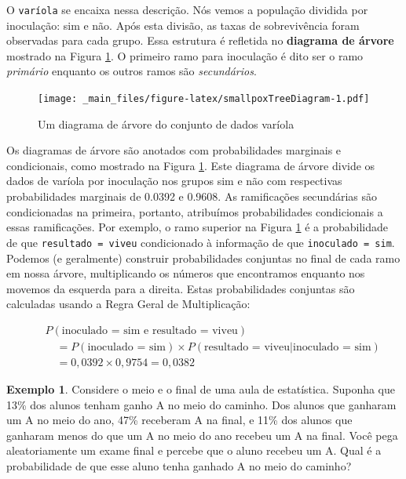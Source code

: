 \documentclass[
]{book}
\theoremstyle{definition}
\theoremstyle{definition}
\newtheorem{example}{Exemplo}[chapter]
\theoremstyle{definition}
\theoremstyle{definition}
\theoremstyle{remark}
\begin{document}
O \texttt{varíola} se encaixa nessa descrição. Nós vemos a população dividida por inoculação: sim e não. Após esta divisão, as taxas de sobrevivência foram observadas para cada grupo. Essa estrutura é refletida no \textbf{diagrama de árvore} mostrado na Figura \ref{fig:smallpoxTreeDiagram}. O primeiro ramo para inoculação é dito ser o ramo \emph{primário} enquanto os outros ramos são \emph{secundários}.

\begin{figure}
\centering
\texttt{[image: \_main\_files/figure-latex/smallpoxTreeDiagram-1.pdf]}
\caption{\label{fig:smallpoxTreeDiagram}Um diagrama de árvore do conjunto de dados varíola}
\end{figure}

Os diagramas de árvore são anotados com probabilidades marginais e condicionais, como mostrado na Figura \ref{fig:smallpoxTreeDiagram}. Este diagrama de árvore divide os dados de varíola por inoculação nos grupos sim e não com respectivas probabilidades marginais de 0.0392 e 0.9608. As ramificações secundárias são condicionadas na primeira, portanto, atribuímos probabilidades condicionais a essas ramificações. Por exemplo, o ramo superior na Figura \ref{fig:smallpoxTreeDiagram} é a probabilidade de que \texttt{resultado\ =\ viveu} condicionado à informação de que \texttt{inoculado\ =\ sim}. Podemos (e geralmente) construir probabilidades conjuntas no final de cada ramo em nossa árvore, multiplicando os números que encontramos enquanto nos movemos da esquerda para a direita. Estas probabilidades conjuntas são calculadas usando a Regra Geral de Multiplicação:

\begin{eqnarray*}
&& P(\text{inoculado = sim e resultado = viveu}) \\
    &&\quad = P(\text{inoculado = sim})\times P(\text{resultado = viveu}|\text{inoculado = sim}) \\
    &&\quad = 0,0392\times 0,9754=0,0382
\end{eqnarray*}

\begin{example}
\protect\hypertarget{exm:exerciseForTreeDiagramOfStudentGettingAOnMidtermGivenThatSheGotAOnFinal}{}{\label{exm:exerciseForTreeDiagramOfStudentGettingAOnMidtermGivenThatSheGotAOnFinal} }Considere o meio e o final de uma aula de estatística. Suponha que 13\% dos alunos tenham ganho A no meio do caminho. Dos alunos que ganharam um A no meio do ano, 47\% receberam A na final, e 11\% dos alunos que ganharam menos do que um A no meio do ano recebeu um A na final. Você pega aleatoriamente um exame final e percebe que o aluno recebeu um A. Qual é a probabilidade de que esse aluno tenha ganhado A no meio do caminho?
\end{example}
\end{document}
